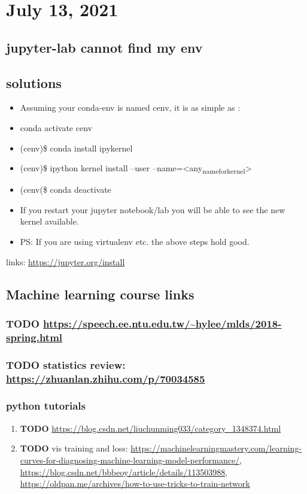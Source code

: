 \documentclass[11pt]{article}
\begin{document}
\section{July 13, 2021}
\label{sec:orgec576e5}
\subsection{jupyter-lab cannot find my env}
\label{sec:org89dc20f}

\subsection{solutions}
\label{sec:org000434f}
\begin{itemize}
\item Assuming your conda-env is named cenv, it is as simple as :
\item conda activate cenv
\item (cenv)\$ conda install ipykernel
\item (cenv)\$ ipython kernel install --user --name=<any\textsubscript{name}\textsubscript{for}\textsubscript{kernel}>
\item (cenv(\$ conda deactivate
\item If you restart your jupyter notebook/lab you will be able to see the new kernel available.
\item PS: If you are using virtualenv etc. the above steps hold good.
\end{itemize}

links: \url{https://jupyter.org/install}


\subsection{Machine learning course links}
\label{sec:org08cda45}
\subsubsection{{\bfseries\sffamily TODO} \url{https://speech.ee.ntu.edu.tw/\~hylee/mlds/2018-spring.html}}
\label{sec:org36c1b1e}
\subsubsection{{\bfseries\sffamily TODO} statistics review: \url{https://zhuanlan.zhihu.com/p/70034585}}
\label{sec:org4296d83}
\subsubsection{python tutorials}
\label{sec:orgeec2711}
\begin{enumerate}
\item {\bfseries\sffamily TODO} \url{https://blog.csdn.net/liuchunming033/category\_1348374.html}
\label{sec:org5e2d6ec}
\item {\bfseries\sffamily TODO} vis training and loss: \url{https://machinelearningmastery.com/learning-curves-for-diagnosing-machine-learning-model-performance/}, \url{https://blog.csdn.net/bbbeoy/article/details/113503988}, \url{https://oldpan.me/archives/how-to-use-tricks-to-train-network}
\label{sec:orgc7a78b6}
\end{enumerate}
\end{document}
